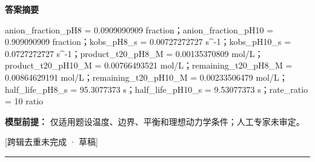 \documentclass[UTF8,11pt,a4paper]{ctexart}
\begin{document}
\noindent\textbf{答案摘要}\par
anion\_fraction\_pH8 = 0.0909090909 fraction；anion\_fraction\_pH10 = 0.909090909 fraction；kobs\_pH8\_s = 0.00727272727 s\textasciicircum{}-1；kobs\_pH10\_s = 0.0727272727 s\textasciicircum{}-1；product\_t20\_pH8\_M = 0.00135370809 mol/L；product\_t20\_pH10\_M = 0.00766493521 mol/L；remaining\_t20\_pH8\_M = 0.00864629191 mol/L；remaining\_t20\_pH10\_M = 0.00233506479 mol/L；half\_life\_pH8\_s = 95.3077373 s；half\_life\_pH10\_s = 9.53077373 s；rate\_ratio = 10 ratio\par
\noindent\textbf{模型前提：}
仅适用题设温度、边界、平衡和理想动力学条件；人工专家未审定。\par
\noindent\textcolor{red!65!black}{[跨辑去重未完成 · 草稿]} \par
\medskip\hrule\medskip
{}
\end{document}
